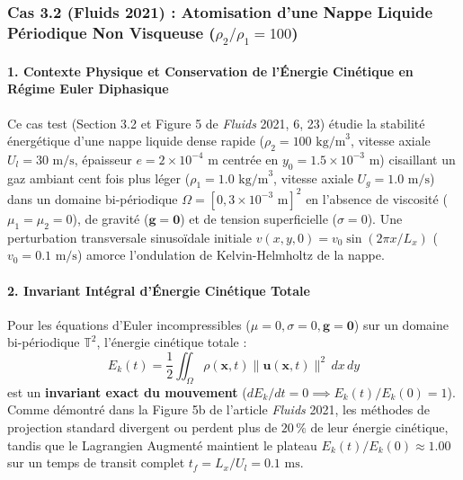 \documentclass[
  10pt,
]{article}
\begin{document}
\subsubsection{\texorpdfstring{Cas 3.2 (Fluids 2021) : Atomisation d'une
Nappe Liquide Périodique Non Visqueuse
(\(\rho_2/\rho_1 = 100\))}{Cas 3.2 (Fluids 2021) : Atomisation d'une Nappe Liquide Périodique Non Visqueuse (\textbackslash rho\_2/\textbackslash rho\_1 = 100)}}\label{cas-3.2-fluids-2021-atomisation-dune-nappe-liquide-puxe9riodique-non-visqueuse-rho_2rho_1-100}

\paragraph{1. Contexte Physique et Conservation de l'Énergie Cinétique
en Régime Euler
Diphasique}\label{contexte-physique-et-conservation-de-luxe9nergie-cinuxe9tique-en-ruxe9gime-euler-diphasique}

Ce cas test (Section 3.2 et Figure 5 de \emph{Fluids} 2021, 6, 23)
étudie la stabilité énergétique d'une nappe liquide dense rapide
(\(\rho_2 = 100\text{ kg/m}^3\), vitesse axiale \(U_l = 30\text{ m/s}\),
épaisseur \(e = 2 \times 10^{-4}\text{ m}\) centrée en
\(y_0 = 1.5 \times 10^{-3}\text{ m}\)) cisaillant un gaz ambiant cent
fois plus léger (\(\rho_1 = 1.0\text{ kg/m}^3\), vitesse axiale
\(U_g = 1.0\text{ m/s}\)) dans un domaine bi-périodique
\(\Omega = [0, 3 \times 10^{-3}\text{ m}]^2\) en l'absence de viscosité
(\(\mu_1 = \mu_2 = 0\)), de gravité (\(\mathbf{g} = \mathbf{0}\)) et de
tension superficielle (\(\sigma = 0\)). Une perturbation transversale
sinusoïdale initiale \(v(x, y, 0) = v_0 \sin(2\pi x / L_x)\)
(\(v_0 = 0.1\text{ m/s}\)) amorce l'ondulation de Kelvin-Helmholtz de la
nappe.

\paragraph{2. Invariant Intégral d'Énergie Cinétique
Totale}\label{invariant-intuxe9gral-duxe9nergie-cinuxe9tique-totale}

Pour les équations d'Euler incompressibles
(\(\mu = 0, \sigma = 0, \mathbf{g} = \mathbf{0}\)) sur un domaine
bi-périodique \(\mathbb{T}^2\), l'énergie cinétique totale :
\[E_k(t) = \frac{1}{2} \iint_\Omega \rho(\mathbf{x}, t) \|\mathbf{u}(\mathbf{x}, t)\|^2 \, dx\,dy\]
est un \textbf{invariant exact du mouvement}
(\(dE_k / dt = 0 \implies E_k(t) / E_k(0) = 1\)). Comme démontré dans la
Figure 5b de l'article \emph{Fluids} 2021, les méthodes de projection
standard divergent ou perdent plus de \(20\,\%\) de leur énergie
cinétique, tandis que le Lagrangien Augmenté maintient le plateau
\(E_k(t)/E_k(0) \approx 1.00\) sur un temps de transit complet
\(t_f = L_x / U_l = 0.1\text{ ms}\).
\end{document}
